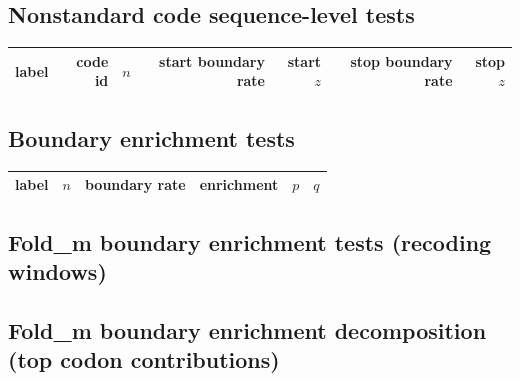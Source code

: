 \subsection{Nonstandard code sequence-level tests}
\label{app:nonstandard_sequence_tests}

\begin{sloppypar}
\noindent
\end{sloppypar}

\begin{center}
\scriptsize
\setlength{\tabcolsep}{4pt}
\renewcommand{\arraystretch}{1.10}
\begin{tabular}{lrrrrrr}
\toprule
label & code id & $n$ & start boundary rate & start $z$ & stop boundary rate & stop $z$ \\
\midrule

\end{tabular}
\end{center}

\subsection{Boundary enrichment tests}
\label{app:boundary_enrichment_results}

\noindent

\begin{center}
\scriptsize
\setlength{\tabcolsep}{4pt}
\renewcommand{\arraystretch}{1.10}
\begin{tabular}{lrrrrr}
\toprule
label & $n$ & boundary rate & enrichment & $p$ & $q$ \\
\midrule

\end{tabular}
\end{center}

\subsection{Fold\_m boundary enrichment tests (recoding windows)}
\label{app:foldm_boundary_enrichment}

\noindent

\noindent

\subsection{Fold\_m boundary enrichment decomposition (top codon contributions)}

